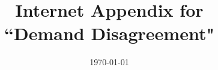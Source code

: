 \begin{titlepage}

  \singlespace {} \setcounter{tmark}{1}
  \renewcommand{\thefootnote}{\fnsymbol{footnote}}
\title{Internet Appendix for \\ ``Demand Disagreement"}

\end{titlepage}

    \date{\today}
\maketitle
